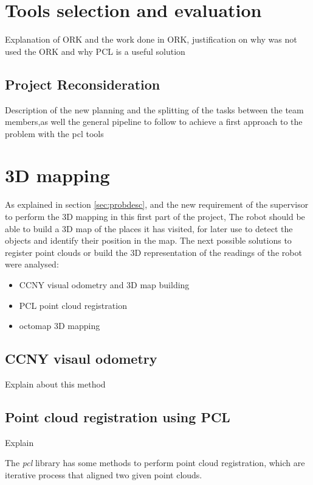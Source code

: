 \documentclass[fontsize=12pt]{article}
\begin{document}
\section{Tools selection and evaluation}
\label{sec:toolseval}

Explanation of ORK and the work done in ORK, justification on why was not used the ORK and why PCL is a useful solution
\subsection{Project Reconsideration}
\label{sec:projreco}
Description of the new planning and the splitting of the tasks between the team members,as well the general pipeline to follow to achieve a first approach to the problem with the pcl tools
\section{3D mapping}
\label{sec:map}
As explained in section \ref{sec:probdesc}, and the new requirement of the supervisor to perform the 3D mapping in this first part of the project, The robot should be able to build a 3D map of the places it has visited, for later use to detect the objects and identify their position in the map. The next possible solutions to register point clouds or build the 3D representation of the readings of the robot were analysed:
\begin{itemize}
\item CCNY visual odometry and 3D map building
\item PCL point cloud registration
\item octomap 3D mapping
\end{itemize}

\subsection{CCNY visaul odometry}
Explain about this method
\subsection{Point cloud registration using PCL}
Explain

The \textit{pcl } library has some methods to perform point cloud registration, which are iterative process that aligned two given point clouds.
 \linebreak
\end{document}
